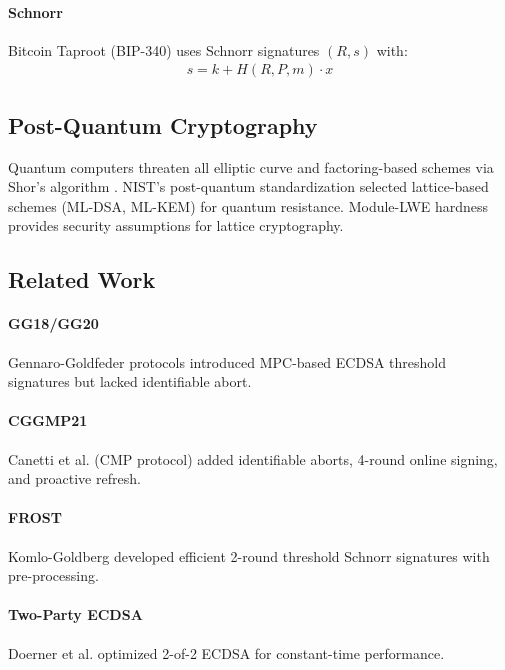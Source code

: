 \paragraph{Schnorr} Bitcoin Taproot (BIP-340) uses Schnorr signatures $(R, s)$ with:
\begin{align*}
s = k + H(R, P, m) \cdot x
\end{align*}

\subsection{Post-Quantum Cryptography}

Quantum computers threaten all elliptic curve and factoring-based schemes via Shor's algorithm \cite{shor1997}. NIST's post-quantum standardization selected lattice-based schemes (ML-DSA, ML-KEM) for quantum resistance. Module-LWE hardness provides security assumptions for lattice cryptography.

\subsection{Related Work}

\paragraph{GG18/GG20} Gennaro-Goldfeder protocols \cite{gennaro2018,gennaro2020} introduced MPC-based ECDSA threshold signatures but lacked identifiable abort.

\paragraph{CGGMP21} Canetti et al. \cite{canetti2021} (CMP protocol) added identifiable aborts, 4-round online signing, and proactive refresh.

\paragraph{FROST} Komlo-Goldberg \cite{komlo2020} developed efficient 2-round threshold Schnorr signatures with pre-processing.

\paragraph{Two-Party ECDSA} Doerner et al. \cite{doerner2018} optimized 2-of-2 ECDSA for constant-time performance.

